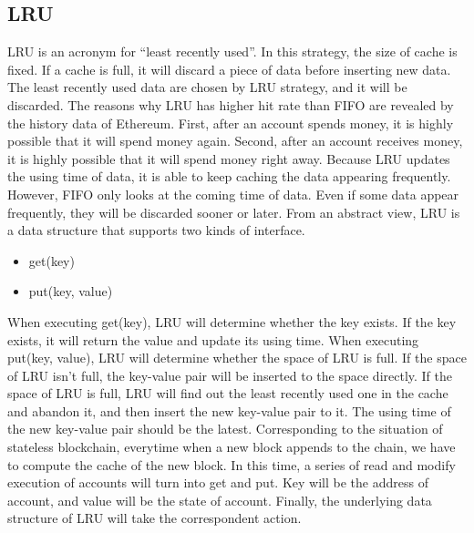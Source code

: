 \documentclass[conference]{IEEEtran}
\begin{document}
\subsection{LRU}
LRU is an acronym for “least recently used”. In this strategy, the size of cache is fixed. If a cache is full, it will discard a piece of data before inserting new data. The least recently used data are chosen by LRU strategy, and it will be discarded.
The reasons why LRU has higher hit rate than FIFO are revealed by the history data of Ethereum. First, after an account spends money, it is highly possible that it will spend money again. Second, after an account receives money,  it is highly possible that it will spend money right away. Because LRU updates the using time of data, it is able to keep caching the data appearing frequently. However, FIFO only looks at the coming time of data. Even if some data appear frequently, they will be discarded sooner or later.
From an abstract view, LRU is a data structure that supports two kinds of interface.
\begin{itemize}
\item get(key)
\item put(key, value)
\end{itemize}
When executing get(key), LRU will determine whether the key exists. If the key exists, it will return the value and update its using time.
When executing put(key, value), LRU will determine whether the space of LRU is full. If the space of LRU isn’t full, the key-value pair will be inserted to the space directly.  If the space of LRU is full, LRU will find out the least recently used one in the cache and abandon it, and then insert the new key-value pair to it. The using time of the new key-value pair should be the latest.
Corresponding to the situation of stateless blockchain, everytime when a new block appends to the chain, we have to compute the cache of the new block. In this time, a series of read and modify execution of accounts will turn into get and put. Key will be the address of account, and value will be the state of account. Finally, the underlying data structure of LRU will take the correspondent action.
\end{document}
